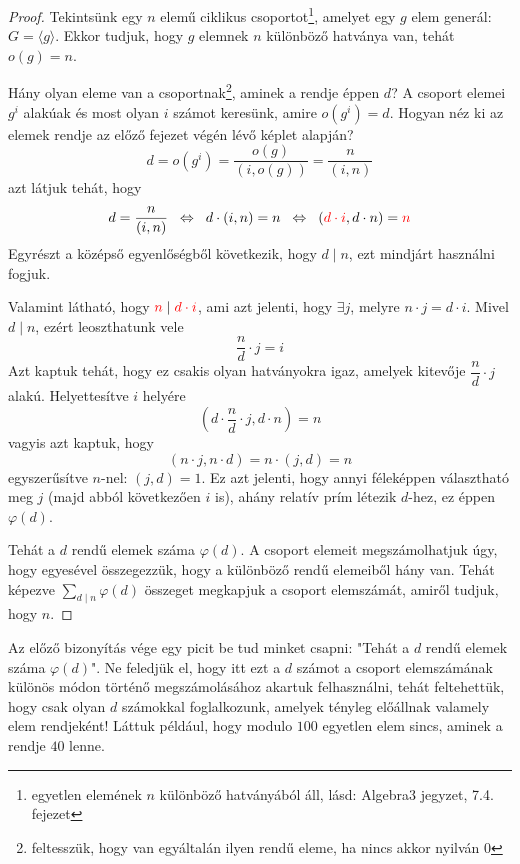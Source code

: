 \documentclass[12pt]{book}
\theoremstyle{plain} %
\theoremstyle{definition} %
\theoremstyle{remark}
\numberwithin{equation}{section}  %
\begin{document}
	\begin{proof}
		Tekintsünk egy $n$ elemű ciklikus csoportot\footnote{egyetlen elemének $n$ különböző hatványából áll, lásd: Algebra3 jegyzet, 7.4. fejezet}, amelyet egy $g$ elem generál: $G = \langle g \rangle$. Ekkor tudjuk, hogy $g$ elemnek $n$ különböző hatványa van, tehát $o(g)=n$.
		
		Hány olyan eleme van a csoportnak\footnote{feltesszük, hogy van egyáltalán ilyen rendű eleme, ha nincs akkor nyilván 0}, aminek a rendje éppen $d$? A csoport elemei $g^i$ alakúak és most olyan $i$ számot keresünk, amire $o(g^i)=d$. Hogyan néz ki az elemek rendje az előző fejezet végén lévő képlet alapján?
		\[ d =  o(g^i) = \dfrac{o(g)}{(i,o(g))} = \dfrac{n}{(i,n)}  \]
		azt látjuk tehát, hogy 
		\[ d = \dfrac{n}{(i,n)} \hspace{2mm} \Leftrightarrow \hspace{2mm} d\cdot (i,n) = n \hspace{2mm} \Leftrightarrow \hspace{2mm} (\color{red}d\cdot i\color{black},d\cdot n) = \color{red}n\color{black}  \]
		Egyrészt a középső egyenlőségből következik, hogy $d\mid n$, ezt mindjárt használni fogjuk.
		
		Valamint látható, hogy $\color{red}n\color{black}\mid \color{red}d\cdot i\color{black}$, ami azt jelenti, hogy $\exists j$, melyre $n\cdot j = d \cdot i$. Mivel $d\mid n$, ezért leoszthatunk vele
		\[ \dfrac{n}{d} \cdot j = i  \]
		Azt kaptuk tehát, hogy ez csakis olyan hatványokra igaz, amelyek kitevője $\dfrac{n}{d}\cdot j$ alakú. Helyettesítve $i$ helyére 
		\[ (d\cdot \dfrac{n}{d} \cdot j, d\cdot n) = n  \]
		vagyis azt kaptuk, hogy
		\[(n \cdot j,n \cdot d) = n\cdot (j,d) = n \]
		egyszerűsítve $n$-nel: $(j,d)=1$. Ez azt jelenti, hogy annyi féleképpen választható meg $j$ (majd abból következően $i$ is), ahány relatív prím létezik $d$-hez, ez éppen $\varphi(d)$.
		
		Tehát a $d$ rendű elemek száma $\varphi(d)$. A csoport elemeit megszámolhatjuk úgy, hogy egyesével összegezzük, hogy a különböző rendű elemeiből hány van. Tehát képezve $\displaystyle \sum_{d\mid n} \varphi(d)$ összeget megkapjuk a csoport elemszámát, amiről tudjuk, hogy $n$.
	\end{proof}
	Az előző bizonyítás vége egy picit be tud minket csapni: "Tehát a $d$ rendű elemek száma $\varphi(d)$". Ne feledjük el, hogy itt ezt a $d$ számot a csoport elemszámának különös módon történő megszámolásához akartuk felhasználni, tehát feltehettük, hogy csak olyan $d$ számokkal foglalkozunk, amelyek tényleg előállnak valamely elem rendjeként! Láttuk például, hogy modulo $100$ egyetlen elem sincs, aminek a rendje $40$ lenne.
	
\end{document}
